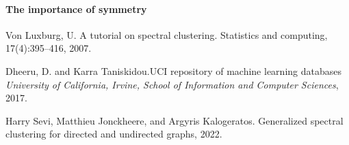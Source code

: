 \documentclass[a4paper,12pt]{article}
\theoremstyle{definition}
\theoremstyle{plain}
\begin{document}
\paragraph{The importance of symmetry}

\newpage
\begin{thebibliography}{9}
Von Luxburg, U. A tutorial on spectral clustering. Statistics and
computing, 17(4):395–416, 2007.

Dheeru, D. and Karra Taniskidou.UCI repository of machine learning databases \textit{University of California, Irvine, School of
	Information and Computer Sciences}, 2017.

Harry Sevi, Matthieu Jonckheere, and Argyris Kalogeratos.
Generalized spectral clustering for directed and undirected graphs,
2022.
\end{thebibliography}
\end{document}
